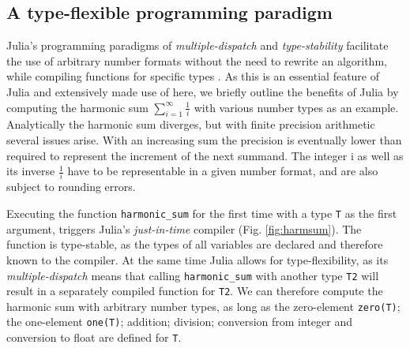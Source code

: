 \subsection{A type-flexible programming paradigm}

Julia's programming paradigms of \emph{multiple-dispatch} and \emph{type-stability} facilitate the use of arbitrary number formats
without the need to rewrite an algorithm, while compiling functions for specific types \citep{Bezanson2017}. As this is an essential
feature of Julia and extensively made use of here, we briefly outline the benefits of Julia by computing the harmonic sum
$\sum_{i=1}^\infty \tfrac{1}{i}$ with various number types as an example. Analytically the harmonic sum diverges, but with
finite precision arithmetic several issues arise. With an increasing sum the precision is eventually lower than required to
represent the increment of the next summand. The integer i as well as its inverse $\tfrac{1}{i}$ have to be representable
in a given number format, and are also subject to rounding errors.

%
%
%
%

Executing the function \texttt{harmonic\_sum} for the first time with a type \texttt{T} as the first argument, triggers Julia's
\emph{just-in-time} compiler (Fig. \ref{fig:harmsum}). The function is type-stable, as the types of all variables are declared
and therefore known to the compiler. At the same time Julia allows for type-flexibility, as its \emph{multiple-dispatch} means
that calling \texttt{harmonic\_sum} with another type \texttt{T2} will result in a separately compiled function for \texttt{T2}.
We can therefore compute the harmonic sum with arbitrary number types, as long as the zero-element \texttt{zero(T)};
the one-element \texttt{one(T)}; addition; division; conversion from integer and conversion to float are defined for \texttt{T}.

